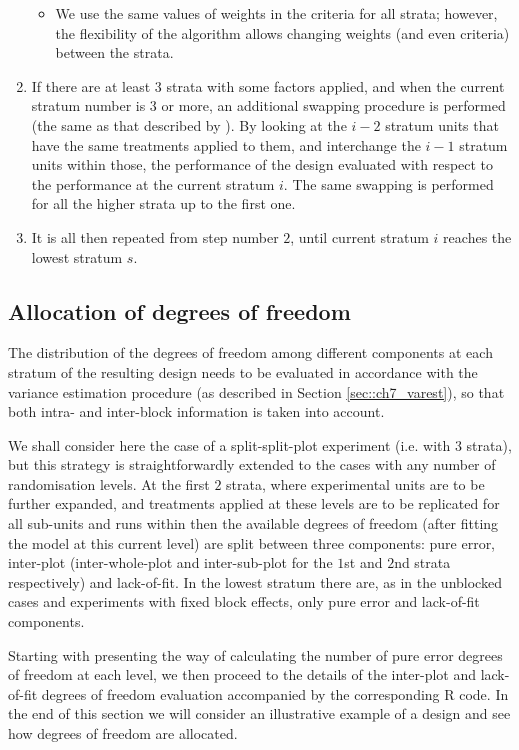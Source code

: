 \begin{enumerate}
\begin{itemize}
\item We use the same values of weights in the criteria for all strata; however, the flexibility of the algorithm allows changing weights (and even criteria) between the strata.
\end{itemize}
\item If there are at least $3$ strata with some factors applied, and when the current stratum number is $3$ or more, an additional swapping procedure is performed (the same as that described by \cite{Trinca2001multistratum}). By looking at the $i-2$ stratum units that have the same treatments applied to them, and interchange the $i-1$ stratum units within those, the performance of the design evaluated with respect to the performance at the current stratum $i$. The same swapping is performed for all the higher strata up to the first one.
\item It is all then repeated from step number $2$, until current stratum $i$ reaches the lowest stratum $s$. 
\end{enumerate}

\subsection{Allocation of degrees of freedom}

The distribution of the degrees of freedom among different components at each stratum of the resulting design needs to be evaluated in accordance with the variance estimation procedure (as described in Section \ref{sec::ch7_varest}), so that both intra- and inter-block information is taken into account. 

We shall consider here the case of a split-split-plot experiment (i.e. with $3$ strata), but this strategy is straightforwardly extended to the cases with any number of randomisation levels. At the first $2$ strata, where experimental units are to be further expanded, and treatments applied at these levels are to be replicated for all sub-units and runs within then the available degrees of freedom (after fitting the model at this current level) are split between three components: pure error, inter-plot (inter-whole-plot and inter-sub-plot for the $1$st and $2$nd strata respectively) and lack-of-fit. In the lowest stratum there are, as in the unblocked cases and experiments with fixed block effects, only pure error and lack-of-fit components.

Starting with presenting the way of calculating the number of pure error degrees of freedom at each level, we then proceed to the details of the inter-plot and lack-of-fit degrees of freedom evaluation accompanied by the corresponding R code. In the end of this section we will consider an illustrative example of a design and see how degrees of freedom are allocated.

